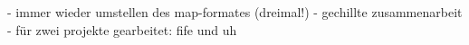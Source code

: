 - immer wieder umstellen des map-formates (dreimal!)
- gechillte zusammenarbeit
- für zwei projekte gearbeitet: fife und uh